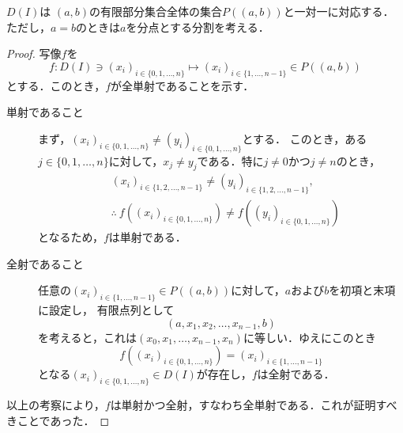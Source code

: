 \begin{prop}{}{}
  $D(I)$は $(a,b)$の有限部分集合全体の集合$P((a,b))$と一対一に対応する．ただし，$a=b$のときは$a$を分点とする分割を考える．
\end{prop}

\begin{tleftbar}
  \begin{proof}
    写像$f$を
    \[
      f \colon D(I) \ni (x_i)_{i \in \{0,1,\ldots,n \}} \mapsto (x_i)_{i \in \{1,\ldots,n-1 \}} \in P((a,b))
    \]
    とする．このとき，$f$が全単射であることを示す．
    \begin{description}
      \item[単射であること] まず，$(x_i)_{i \in \{0,1,\ldots,n \}} \neq (y_i)_{i \in \{0,1,\ldots,n\}}$とする．
      このとき，ある$j \in \{0,1,\ldots,n \}$に対して，$ x_j \ne y_j $である．特に$ j \ne 0$かつ$j \ne n$のとき，
      \begin{align*}
        & (x_i)_{i \in \{1,2,\ldots,n-1 \}} \neq (y_i)_{i \in \{1,2,\ldots,n-1\}}, \\
        & \therefore ~ f((x_i)_{i \in \{0,1,\ldots,n \}}) \neq f((y_i)_{i \in \{0,1,\ldots,n\}})
      \end{align*}
      となるため，$f$は単射である．
      \item[全射であること] 任意の$(x_i)_{i \in \{1,\ldots,n-1 \}} \in P((a,b))$に対して，$a$および$b$を初項と末項に設定し，
      有限点列として
      \[
      (a,x_1,x_2,\ldots,x_{n-1},b)
      \]
      を考えると，これは$(x_0,x_1,\ldots,x_{n-1},x_n)$に等しい．ゆえにこのとき
      \[
      f((x_i)_{i \in \{0,1,\ldots,n\}})=(x_i)_{i \in \{1,\ldots,n-1 \}}
      \]
      となる$(x_i)_{i \in \{0,1,\ldots,n \}} \in D(I)$が存在し，$f$は全射である．
    \end{description}
    以上の考察により，$f$は単射かつ全射，すなわち全単射である．これが証明すべきことであった．
  \end{proof}
\end{tleftbar}
